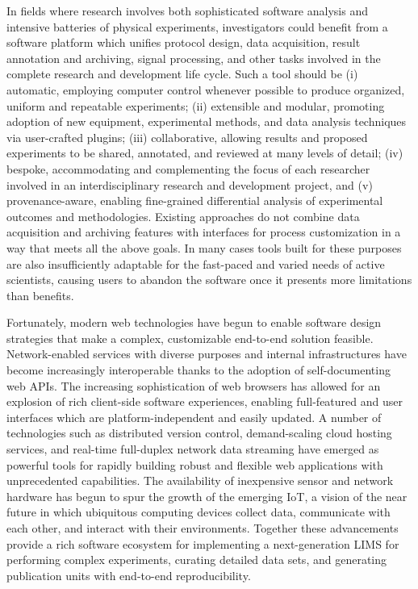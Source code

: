 \documentclass[../thesis]{subfiles}
\begin{document}
In fields where research involves both sophisticated software analysis
and intensive batteries of physical experiments, investigators could
benefit from a software platform which unifies protocol design, data
acquisition, result annotation and archiving, signal processing, and
other tasks involved in the complete research and development life
cycle. Such a tool should be (i) automatic, employing computer control
whenever possible to produce organized, uniform and repeatable
experiments; (ii) extensible and modular, promoting adoption of new
equipment, experimental methods, and data analysis techniques via
user-crafted plugins; (iii) collaborative, allowing results and
proposed experiments to be shared, annotated, and reviewed at many
levels of detail; (iv) bespoke, accommodating and complementing the
focus of each researcher involved in an interdisciplinary research and
development project, and (v) provenance-aware, enabling fine-grained
differential analysis of experimental outcomes and
methodologies. Existing approaches do not combine data acquisition and
archiving features with interfaces for process customization in a way
that meets all the above goals. In many cases tools built for
these purposes are also insufficiently adaptable for the fast-paced
and varied needs of active scientists, causing users to abandon the
software once it presents more limitations than benefits.

Fortunately, modern web technologies have begun
to enable software design strategies that make a complex, customizable
end-to-end solution feasible. Network-enabled services with
diverse purposes and internal infrastructures have become increasingly
interoperable thanks to the adoption of self-documenting web \glspl{API}. The
increasing sophistication of web browsers has allowed for an
explosion of rich client-side software experiences, enabling
full-featured and user interfaces which are platform-independent and easily
updated. A number of technologies such as distributed version control,
demand-scaling cloud hosting services, and real-time full-duplex
network data streaming have emerged as powerful tools for
rapidly building robust and flexible web applications with
unprecedented capabilities. The
availability of inexpensive sensor and network hardware has begun to
spur the growth of the emerging \gls{IoT}, a vision of the
near future in which ubiquitous computing devices collect data,
communicate with each other, and interact with their environments.
Together these advancements provide a rich software ecosystem for
implementing a next-generation \gls{LIMS} for performing complex
experiments, curating detailed data sets, and generating publication
units with end-to-end reproducibility.
\end{document}

